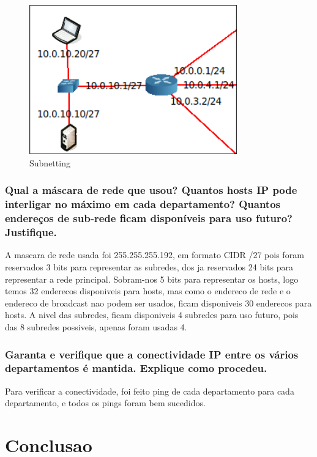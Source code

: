 \documentclass{article}
\begin{document}
\begin{figure}[h]
    \centering
    \includegraphics[width=0.8\textwidth]{images/subnetting.png}
    \caption{\label{fig:subnetting}Subnetting}
\end{figure}

\subsubsection{Qual a máscara de rede que usou? Quantos hosts IP
pode interligar no máximo em cada departamento? Quantos endereços
de sub-rede ficam disponíveis para uso futuro? Justifique.}

A mascara de rede usada foi 255.255.255.192, em formato CIDR /27 pois foram reservados 3 bits para representar as subredes, dos ja reservados 24 bits para representar a rede principal.
Sobram-nos 5 bits para representar os hosts, logo temos 32 enderecos disponiveis para hosts, mas como o endereco de rede e o endereco de broadcast nao podem ser usados, ficam disponiveis 30 enderecos para hosts.
A nivel das subredes, ficam disponiveis 4 subredes para uso futuro, pois das 8 subredes possiveis, apenas foram usadas 4.

\subsubsection{Garanta e verifique que a conectividade IP entre os vários
departamentos é mantida. Explique como procedeu.}

Para verificar a conectividade, foi feito ping de cada departamento para cada departamento, e todos os pings foram bem sucedidos.

\section{Conclusao}
\end{document}
